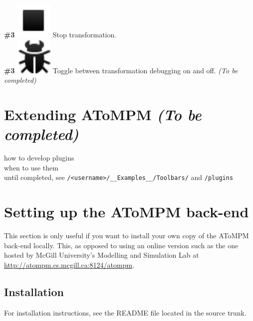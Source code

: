 \documentclass{article}
\numberwithin{equation}{section}
\numberwithin{figure}{section}
\newcommand{\TBC}{\textit{(To be completed) }}
\begin{document}
\textbf{\#3} \hspace*{1cm}
\includegraphics[scale=0.5]{figures/icon_stop} \hspace*{1cm}
Stop transformation.\\

\textbf{\#3} \hspace*{1cm}
\includegraphics[scale=0.5]{figures/icon_toggledebug} \hspace*{1cm}
Toggle between transformation debugging on and off. \TBC




\newpage
\section{Extending AToMPM \TBC}
how to develop plugins\\
when to use them\\

until completed, see \texttt{/<username>/\_\_Examples\_\_/Toolbars/} and \texttt{/plugins}





\newpage
\appendix
\section{Setting up the AToMPM back-end}
This section is only useful if you want to install your own copy of the AToMPM back-end locally. This, as opposed to using an online version such as the one hosted by McGill University's Modelling and Simulation Lab at \url{http://atompm.cs.mcgill.ca:8124/atompm}.


\subsection{Installation}
For installation instructions, see the README file located in the source trunk.
\end{document}
